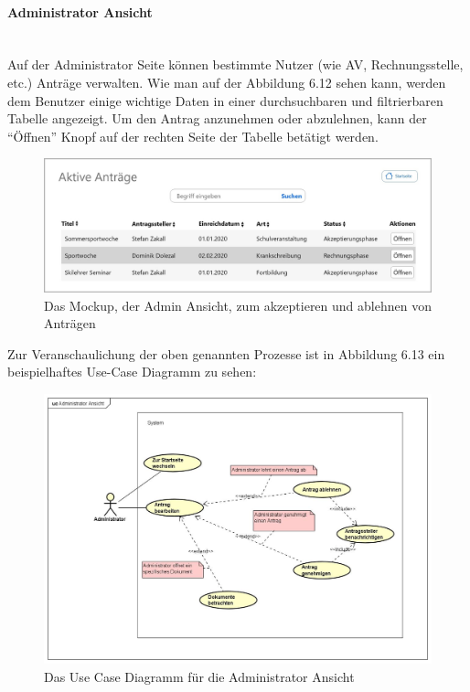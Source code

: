 \paragraph{Administrator Ansicht}
~\\
Auf der Administrator Seite können bestimmte Nutzer (wie AV, Rechnungsstelle, etc.) Anträge verwalten. Wie man auf der Abbildung 6.12 sehen kann, werden dem Benutzer einige wichtige Daten in einer durchsuchbaren und filtrierbaren Tabelle angezeigt. Um den Antrag anzunehmen oder abzulehnen, kann der \enquote{Öffnen} Knopf auf der rechten Seite der Tabelle betätigt werden.
\begin{figure}[H]
	\centering
	\includegraphics[width=1\linewidth]{images/Mockup-Admin}
	\caption[Mockup Adminansicht]{Das Mockup, der Admin Ansicht, zum akzeptieren und ablehnen von Anträgen}
	\label{fig:mockupAdmin}
\end{figure}
Zur Veranschaulichung der oben genannten Prozesse ist in Abbildung 6.13 ein beispielhaftes Use-Case Diagramm zu sehen: 
\begin{figure}[H]
	\centering
	\includegraphics[width=1\linewidth]{images/uc-admin}
	\caption[Use Case Diagramm Adminansicht]{Das Use Case Diagramm für die Administrator Ansicht}
	\label{fig:ucAdmin}
\end{figure}
